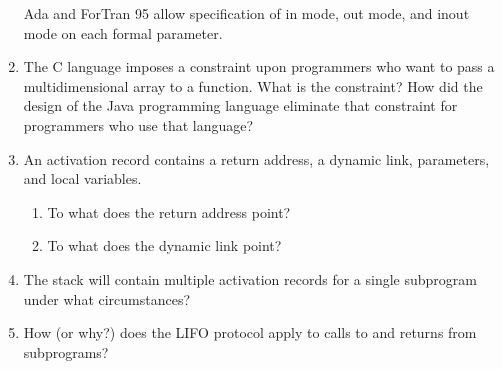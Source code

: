 \begin{enumerate}
    \begin{answer}

    Ada and ForTran 95 allow specification of in mode, out mode, and inout mode on each formal parameter.
    
    \end{answer}
 
  \item The C language imposes a constraint upon programmers
    who want to pass a multidimensional array to a function.
    What is the constraint? How did the design of the Java
    programming language eliminate that constraint for 
    programmers who use that language?

    \begin{answer}
    
    \end{answer}

  \item An activation record contains a return
    address, a dynamic link, parameters, and
    local variables.
  \begin{enumerate}
    \item To what does the return address point?

    \begin{answer}
    
    \end{answer}

    \item To what does the dynamic link point?

    \begin{answer}
    
    \end{answer}

    \end{enumerate}

  \item The stack will contain multiple activation
    records for a single subprogram under what
    circumstances?

    \begin{answer}
    
    \end{answer}

  \item How (or why?) does the LIFO protocol apply to
    calls to and returns from subprograms?

    \begin{answer}
    
    \end{answer}


\end{enumerate}
